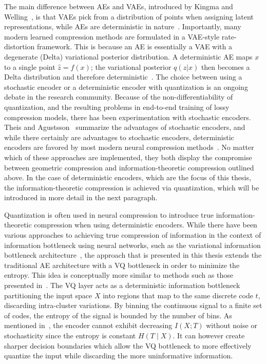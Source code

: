 The main difference between AEs and VAEs, introduced by Kingma and Welling~\cite{Kingma2013}, is that VAEs pick from a distribution of points when assigning latent representations, while AEs are deterministic in nature~\cite{Chen2023}. Importantly, many modern learned compression methods are formulated in a VAE-style rate-distortion framework. This is because an AE is essentially a VAE with a degenerate (Delta) variational posterior distribution. A deterministic AE maps $x$ to a single point $\hat{z} = f(x)$; the variational posterior $q(z|x)$ then becomes a Delta distribution and therefore deterministic~\cite[pp.~145--146]{Yang2022}. The choice between using a stochastic encoder or a deterministic encoder with quantization is an ongoing debate in the research community. Because of the non-differentiability of quantization, and the resulting problems in end-to-end training of lossy compression models, there has been experimentation with stochastic encoders. Theis and Agustsson~\cite{Theis2021} summarize the advantages of stochastic encoders, and while there certainly are advantages to stochastic encoders, deterministic encoders are favored by most modern neural compression methods~\cite{Yang2022, Theis2021}. No matter which of these approaches are implemented, they both display the compromise between geometric compression and information-theoretic compression outlined above. In the case of deterministic encoders, which are the focus of this thesis, the information-theoretic compression is achieved via quantization, which will be introduced in more detail in the next paragraph.

Quantization is often used in neural compression to introduce true information-theoretic compression when using deterministic encoders. While there have been various approaches to achieving true compression of information in the context of information bottleneck using neural networks, such as the variational information bottleneck architecture~\cite{Alemi2016}, the approach that is presented in this thesis extends the traditional AE architecture with a VQ bottleneck in order to minimize the entropy. This idea is conceptually more similar to methods such as those presented in~\cite[pp.~1611--1630]{Strouse2016}. The VQ layer acts as a deterministic information bottleneck partitioning the input space $X$ into regions that map to the same discrete code $t$, discarding intra-cluster variations. By binning the continuous signal to a finite set of codes, the entropy of the signal is bounded by the number of bins. As mentioned in~\cite{Saxe2018}, the encoder cannot exhibit decreasing $I(X;T)$ without noise or stochasticity since the entropy is constant $H(T\mid X)$. It can however create sharper decision boundaries which allow the VQ bottleneck to more effectively quantize the input while discarding the more uninformative information. 

